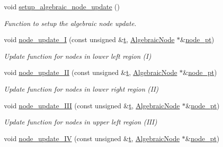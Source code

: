 \begin{DoxyCompactItemize}
\item 
void \hyperlink{classoomph_1_1AlgebraicChannelWithLeafletMesh_a0d6cb8a8ffa830cdd73aa0f6686f150f}{setup\+\_\+algebraic\+\_\+node\+\_\+update} ()
\begin{DoxyCompactList}\small\item\em Function to setup the algebraic node update. \end{DoxyCompactList}\item 
void \hyperlink{classoomph_1_1AlgebraicChannelWithLeafletMesh_a53de0d31556bc78e22b5c06bb66bdd73}{node\+\_\+update\+\_\+I} (const unsigned \&\hyperlink{cfortran_8h_af6f0bd3dc13317f895c91323c25c2b8f}{t}, \hyperlink{classoomph_1_1AlgebraicNode}{Algebraic\+Node} $\ast$\&\hyperlink{classoomph_1_1AlgebraicMesh_aedeebbe95d2f8e67e9939cecd1be3933}{node\+\_\+pt})
\begin{DoxyCompactList}\small\item\em Update function for nodes in lower left region (I) \end{DoxyCompactList}\item 
void \hyperlink{classoomph_1_1AlgebraicChannelWithLeafletMesh_aafaeee96d0e7602cc990229abbd9c8fd}{node\+\_\+update\+\_\+\+II} (const unsigned \&\hyperlink{cfortran_8h_af6f0bd3dc13317f895c91323c25c2b8f}{t}, \hyperlink{classoomph_1_1AlgebraicNode}{Algebraic\+Node} $\ast$\&\hyperlink{classoomph_1_1AlgebraicMesh_aedeebbe95d2f8e67e9939cecd1be3933}{node\+\_\+pt})
\begin{DoxyCompactList}\small\item\em Update function for nodes in lower right region (II) \end{DoxyCompactList}\item 
void \hyperlink{classoomph_1_1AlgebraicChannelWithLeafletMesh_a5aed6f41b197dc7aab1d5d86b1b7d6d5}{node\+\_\+update\+\_\+\+I\+II} (const unsigned \&\hyperlink{cfortran_8h_af6f0bd3dc13317f895c91323c25c2b8f}{t}, \hyperlink{classoomph_1_1AlgebraicNode}{Algebraic\+Node} $\ast$\&\hyperlink{classoomph_1_1AlgebraicMesh_aedeebbe95d2f8e67e9939cecd1be3933}{node\+\_\+pt})
\begin{DoxyCompactList}\small\item\em Update function for nodes in upper left region (I\+II) \end{DoxyCompactList}\item 
void \hyperlink{classoomph_1_1AlgebraicChannelWithLeafletMesh_ac960faed226fa81f52ca605cffe3d1af}{node\+\_\+update\+\_\+\+IV} (const unsigned \&\hyperlink{cfortran_8h_af6f0bd3dc13317f895c91323c25c2b8f}{t}, \hyperlink{classoomph_1_1AlgebraicNode}{Algebraic\+Node} $\ast$\&\hyperlink{classoomph_1_1AlgebraicMesh_aedeebbe95d2f8e67e9939cecd1be3933}{node\+\_\+pt})

\end{DoxyCompactItemize}
